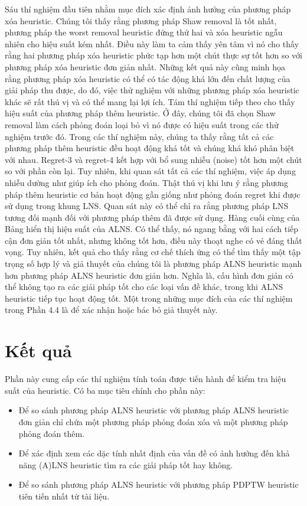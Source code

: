 Sáu thí nghiệm đầu tiên nhằm mục đích xác định ảnh hưởng của phương pháp xóa heuristic. Chúng tôi thấy rằng phương pháp Shaw removal là tốt nhất, phương pháp the worst removal heuristic đứng thứ hai và xóa heuristic ngẫu nhiên cho hiệu suất kém nhất. Điều này làm ta cảm thấy yên tâm vì nó cho thấy rằng hai phương pháp xóa heuristic phức tạp hơn một chút thực sự tốt hơn so với phương pháp xóa heuristic đơn giản nhất. Những kết quả này cũng minh họa rằng phương pháp xóa heuristic có thể có tác động khá lớn đến chất lượng của giải pháp thu được, do đó, việc thử nghiệm với những phương pháp xóa heuristic khác sẽ rất thú vị và có thể mang lại lợi ích.
Tám thí nghiệm tiếp theo cho thấy hiệu suất của phương pháp thêm heuristic. Ở đây, chúng tôi đã chọn Shaw removal làm cách phỏng đoán loại bỏ vì nó được có hiệu suất trong các thử nghiệm trước đó. Trong các thí nghiệm này, chúng ta thấy rằng tất cả các phương pháp thêm heuristic đều hoạt động khá tốt và chúng khá khó phân biệt với nhau. Regret-3 và regret-4 kết hợp với bổ sung nhiễu (noise) tốt hơn một chút so với phần còn lại. Tuy nhiên, khi quan sát tất cả các thí nghiệm, việc áp dụng nhiễu dường như giúp ích cho phỏng đoán. Thật thú vị khi lưu ý rằng phương pháp thêm heuristic cơ bản hoạt động gần giống như phỏng đoán regret khi được sử dụng trong khung LNS. Quan sát này có thể chỉ ra rằng phương pháp LNS tương đối mạnh đối với phương pháp thêm đã được sử dụng.
Hàng cuối cùng của Bảng hiển thị hiệu suất của ALNS. Có thể thấy, nó ngang bằng với hai cách tiếp cận đơn giản tốt nhất, nhưng không tốt hơn, điều này thoạt nghe có vẻ đáng thất vọng. Tuy nhiên, kết quả cho thấy rằng cơ chế thích ứng có thể tìm thấy một tập trọng số hợp lý và giả thuyết của chúng tôi là phương pháp ALNS heuristic mạnh hơn phương pháp ALNS heuristic đơn giản hơn. Nghĩa là, cấu hình đơn giản có thể không tạo ra các giải pháp tốt cho các loại vấn đề khác, trong khi ALNS heuristic tiếp tục hoạt động tốt.
Một trong những mục đích của các thí nghiệm trong Phần 4.4 là để xác nhận hoặc bác bỏ giả thuyết này.

\section{Kết quả}
Phần này cung cấp các thí nghiệm tính toán được tiến hành để kiểm tra hiệu suất của heuristic. Có ba mục tiêu chính cho phần này:
\begin{itemize}
    \item Để so sánh phương pháp ALNS heuristic với phương pháp ALNS heuristic đơn giản chỉ chứa một phương pháp phỏng đoán xóa và một phương pháp phỏng đoán thêm.
    \item Để xác định xem các dặc tính nhất định của vấn đề có ảnh hưởng đến khả năng (A)LNS heuristic tìm ra các giải pháp tốt hay không.
    \item Để so sánh phương pháp ALNS heuristic với phương pháp PDPTW heuristic tiên tiến nhất từ tài liệu.
   
\end{itemize}

